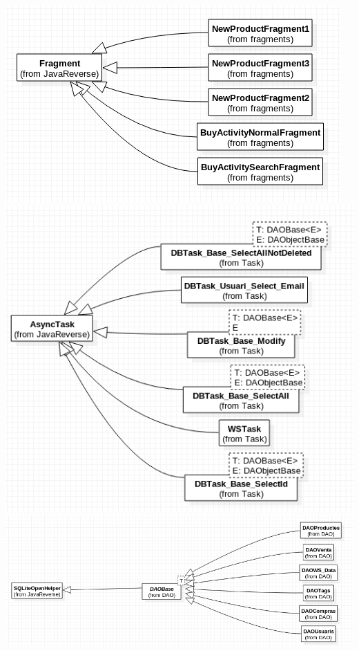 \documentclass{article}
\begin{document}
\begin{center}
	\includegraphics[scale=0.5]{img/4.png}
	\includegraphics[scale=0.5]{img/5.png}
	\includegraphics[scale=0.5]{img/6.png}

\end{center}
\end{document}
